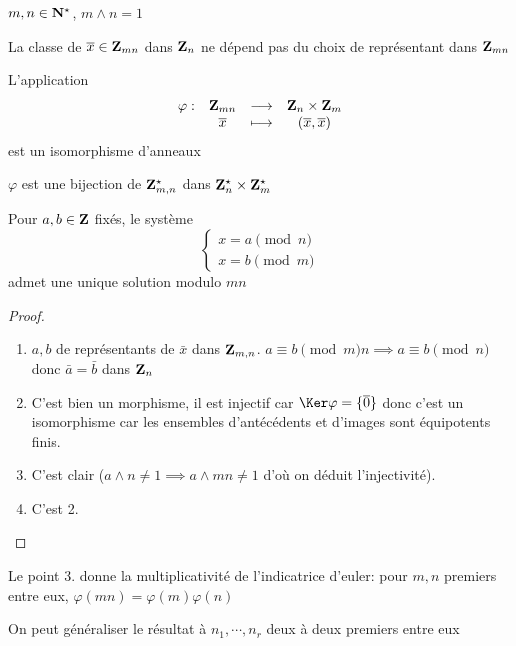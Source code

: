 \begin{thm}
    \Hyp $m, n\in\mathbf N^\star$, $m\land n=1$
    \begin{concenum}
    \item La classe de $\overline{x}\in\mathbf Z_{mn}$ dans $\mathbf Z_n$ ne dépend pas du choix de représentant dans $\mathbf Z_{mn}$
    \item L'application \[
            \begin{matrix}
                \varphi: & \mathbf Z_{mn} & \longrightarrow & \mathbf Z_n\times \mathbf Z_m \\
                         & \overline{x} &\longmapsto & (\overline{x}, \overline{x})
            \end{matrix}
        \]
        est un isomorphisme d'anneaux
    \item $\varphi$ est une bijection de $\mathbf Z_{m, n}^\star$ dans $\mathbf Z_n^\star \times \mathbf Z_m^\star$
    \item Pour $a, b\in\mathbf Z$ fixés, le système \[
            \begin{cases}
                x=a\pmod n\\
                x=b\pmod m
            \end{cases}
        \]
        admet une unique solution modulo $mn$
    \end{concenum}
\end{thm}

\begin{proof}~
    \begin{enumerate}
        \item $a, b$ de représentants de $\bar x$ dans $\mathbf Z_{m, n}$. $a\equiv b\pmod mn\implies a\equiv b\pmod n$ donc $\bar a=\bar b$ dans $\mathbf Z_n$
        \item C'est bien un morphisme, il est injectif car $\Ker\varphi=\{\bar 0\}$ donc c'est un isomorphisme car les ensembles d'antécédents et d'images sont équipotents finis.
        \item C'est clair ($a\land n\neq 1\implies a\land mn\neq 1$ d'où on déduit l'injectivité).
        \item C'est 2.
    \end{enumerate}
\end{proof}

\begin{rem}
    Le point 3. donne la multiplicativité de l'indicatrice d'euler: pour $m, n$ premiers entre eux, $\varphi(mn)=\varphi(m)\varphi(n)$
\end{rem}

\begin{rem}
    On peut généraliser le résultat à $n_1, \cdots, n_r$ deux à deux premiers entre eux
\end{rem}

